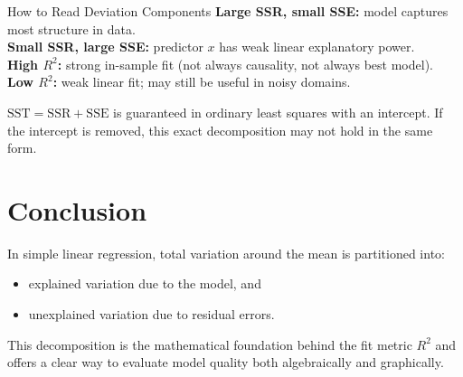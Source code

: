 \documentclass[12pt,a4paper]{article}
\begin{document}
\begin{defbox}{How to Read Deviation Components}
\textbf{Large SSR, small SSE:} model captures most structure in data.\\
\textbf{Small SSR, large SSE:} predictor $x$ has weak linear explanatory power.\\
\textbf{High $R^2$:} strong in-sample fit (not always causality, not always best model).\\
\textbf{Low $R^2$:} weak linear fit; may still be useful in noisy domains.
\end{defbox}

\begin{warningbox}
$\text{SST}=\text{SSR}+\text{SSE}$ is guaranteed in ordinary least squares with an intercept. If the intercept is removed, this exact decomposition may not hold in the same form.
\end{warningbox}

\section{Conclusion}

In simple linear regression, total variation around the mean is partitioned into:
\begin{itemize}[noitemsep]
    \item explained variation due to the model, and
    \item unexplained variation due to residual errors.
\end{itemize}

This decomposition is the mathematical foundation behind the fit metric $R^2$ and offers a clear way to evaluate model quality both algebraically and graphically.
\end{document}
